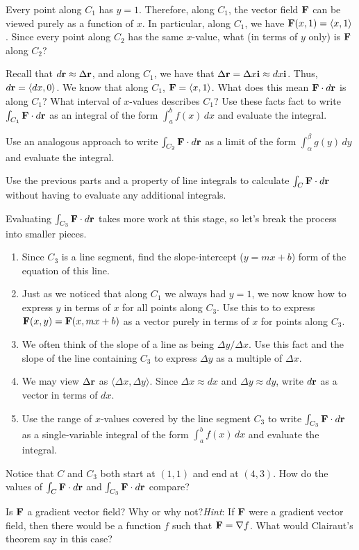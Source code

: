 \begin{pa}
\ba
\item Every point along $C_1$ has $y=1$. Therefore, along $C_1$, the
  vector field $\mathbf{F}$ can be viewed purely as a function of $x$. In
  particular, along $C_1$, we have $\mathbf{F}(x,1) = \langle
  x,1\rangle$.
  Since every point along $C_2$ has the same $x$-value, what (in terms
  of $y$ only) is $\mathbf{F}$ along $C_2$?
\item Recall that $d\mathbf{r} \approx \Delta \mathbf{r}$, and along $C_1$, we have
  that $\Delta\mathbf{r} = \Delta x\mathbf{i} \approx dx\mathbf{i}$. Thus, $d\mathbf{r} = \langle
  dx,0\rangle$. We know that along $C_1$, $\mathbf{F} = \langle
  x,1\rangle$. What does this mean $\mathbf{F}\cdot d\mathbf{r}$ is along $C_1$?
  What interval of $x$-values describes $C_1$? Use these facts
  fact to write $\int_{C_1} \mathbf{F}\cdot d\mathbf{r}$ as an integral of the form
  $\int_a^b f(x)\, dx$ and evaluate the integral. 
\item Use an analogous approach to write $\int_{C_2} \mathbf{F}\cdot d\mathbf{r}$ as
  a limit of the form $\int_\alpha^\beta g(y)\, dy$ and evaluate the
  integral.
\item Use the previous parts and a property of line integrals to
  calculate $\int_C\mathbf{F}\cdot d\mathbf{r}$ without having to evaluate any
  additional integrals. 
\item Evaluating $\int_{C_3}\mathbf{F}\cdot d\mathbf{r}$ takes more work at this
  stage, so let's break the process into smaller pieces.
  \begin{enumerate}[label=\roman*.]
\label{F:12.3.field-segments}  \item Since $C_3$ is a line segment, find the slope-intercept
    ($y=mx+b$) form of the equation of this line.
  \item Just as we noticed that along $C_1$ we always had $y=1$, we
    now know how to express $y$ in terms of $x$ for all points along
    $C_3$. Use this to to express $\mathbf{F}(x,y) = \mathbf{F}(x,mx+b)$ as a
    vector purely in terms of $x$ for points along $C_3$.
  \item We often think of the slope of a line as being $\Delta
    y/\Delta x$. Use this fact and the slope of the line containing
    $C_3$ to express $\Delta y$ as a multiple of $\Delta x$. 
  \item We may view $\Delta\mathbf{r}$ as $\langle \Delta x,\Delta y\rangle$.
    Since $\Delta x\approx dx$ and $\Delta y\approx dy$,
    write $d\mathbf{r}$ as a vector in terms of $dx$.
  \item Use the range of $x$-values covered by the line segment $C_3$
    to write $\int_{C_3}\mathbf{F}\cdot d\mathbf{r}$ as a single-variable integral
    of the form $\int_a^b f(x)\, dx$ and evaluate the integral.
  \end{enumerate}
\item Notice that $C$ and $C_3$ both start at $(1,1)$ and end at
  $(4,3)$. How do the values of $\int_C\mathbf{F}\cdot d\mathbf{r}$ and
  $\int_{C_3}\mathbf{F}\cdot d\mathbf{r}$ compare?
\item Is $\mathbf{F}$ a gradient vector field? Why or why not?\emph{Hint}: If
  $\mathbf{F}$ were a gradient vector field, then there would be a function
  $f$ such that $\mathbf{F} = \nabla f$. What would Clairaut's theorem say in
  this case?
\ea
\end{pa} 
\afterpa 
